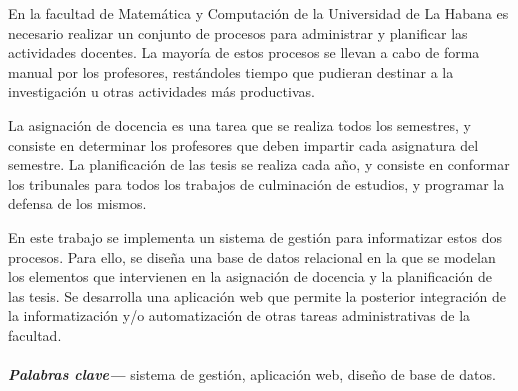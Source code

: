 \begin{resumen}
	En la facultad de Matemática y Computación de la Universidad de La Habana es necesario realizar un conjunto de
    procesos para administrar y planificar las actividades docentes. La mayoría de estos procesos se llevan a cabo
    de forma manual por los profesores, restándoles tiempo que pudieran destinar a la investigación
    u otras actividades más productivas.

    La asignación de docencia es una tarea que se realiza todos los semestres, y consiste en determinar los profesores  
    que deben impartir cada asignatura del semestre. 
    La planificación de las tesis se realiza cada año, y consiste en conformar los tribunales para todos los
    trabajos de culminación de estudios, y programar la defensa de los mismos.

    En este trabajo se implementa
    un sistema de gestión para informatizar estos dos procesos.
    Para ello, se diseña una base de datos relacional en la que se modelan los elementos que intervienen en 
    la asignación de docencia y la planificación de las tesis. 
    Se desarrolla una aplicación web que permite la posterior integración de la informatización y/o automatización 
    de otras tareas administrativas de la facultad.




    \paragraph*{}
  \textbf{\emph{Palabras clave---}} sistema de gestión, aplicación web, diseño de base de datos.
\end{resumen}

